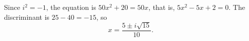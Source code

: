 Since $i^2=-1$, the equation is $50x^2+20=50x$, that is, $5x^2-5x+2=0$. The discriminant is $25-40=-15$, so
\[x=\boxed{\dfrac{5\pm i\sqrt{15}}{10}}.\]
